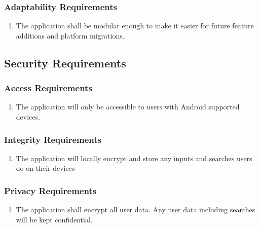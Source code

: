 \documentclass[titlepage]{article}
\newcounter{myCounter}
\begin{document}
\subsubsection{Adaptability Requirements}
\label{ssub:adaptability_requirements}
\begin{enumerate}[{MS}1. ]
    \setcounter{enumi}{\themyCounter}
    \item The application shall be modular enough to make it easier for future feature additions and
    platform migrations.
    \setcounter{myCounter}{\theenumi}
\end{enumerate}


\subsection{Security Requirements}
\label{sub:security_requirements}
\setcounter{myCounter}{0}

\subsubsection{Access Requirements}
\label{ssub:access_requirements}
\begin{enumerate}[{SR}1. ]
    \setcounter{enumi}{\themyCounter}
	\item The application will only be accessible to users with Android supported devices.
    \setcounter{myCounter}{\theenumi}
\end{enumerate}

\subsubsection{Integrity Requirements}
\label{ssub:integrity_requirements}
\begin{enumerate}[{SR}1. ]
    \setcounter{enumi}{\themyCounter}
    \item The application will locally encrypt and store any inputs and searches users do on their
    devices
    \setcounter{myCounter}{\theenumi}
\end{enumerate}

\subsubsection{Privacy Requirements}
\label{ssub:privacy_requirements}
\begin{enumerate}[{SR}1. ]
    \setcounter{enumi}{\themyCounter}
    \item The application shall encrypt all user data. Any user data including searches will be kept
    confidential.
    \setcounter{myCounter}{\theenumi}
\end{enumerate}
\end{document}
